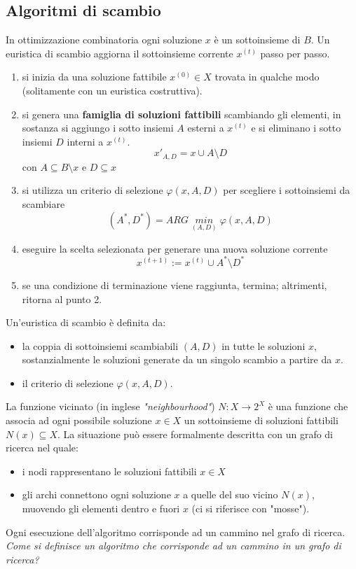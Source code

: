 \documentclass{article}
\begin{document}
\subsection{Algoritmi di scambio}
In ottimizzazione combinatoria ogni soluzione $x$ è un sottoinsieme di $B$. Un euristica
di scambio aggiorna il sottoinsieme corrente $x^{(t)}$ passo per passo.
\begin{enumerate}
    \item si inizia da una soluzione fattibile $x^{(0)}\in X$ trovata in qualche modo
          (solitamente con un euristica costruttiva).
    \item si genera una \textbf{famiglia di soluzioni fattibili} scambiando gli elementi,
          in sostanza si aggiungo i sotto insiemi $A$ esterni a $x^{(t)}$ e si eliminano i sotto insiemi $D$
          interni a $x^{(t)}$.
          $$x'_{A,D}=x\cup A\setminus D$$ con $A\subseteq B\setminus x$ e $D\subseteq x$
    \item si utilizza un criterio di selezione $\varphi(x,A,D)$ per scegliere i sottoinsiemi
          da scambiare
          $$(A^*,D^*)=ARG\;\underset{(A,D)}{min}\;\varphi(x,A,D)$$
    \item eseguire la scelta selezionata per generare una nuova soluzione corrente
          $$x^{(t+1)}:=x^{(t)}\cup A^*\setminus D^*$$
    \item se una condizione di terminazione viene raggiunta, termina; altrimenti, ritorna al punto 2.
\end{enumerate}

Un'euristica di scambio è definita da:
\begin{itemize}
    \item la coppia di sottoinsiemi scambiabili $(A,D)$ in tutte le soluzioni $x$,
          sostanzialmente le soluzioni generate da un singolo scambio a partire da $x$.
    \item il criterio di selezione $\varphi(x,A,D)$.
\end{itemize}
La funzione vicinato (in inglese \textit{"neighbourhood"}) $N:X\rightarrow2^X$ è una
funzione che associa ad ogni possibile soluzione $x\in X$ un sottoinsieme di soluzioni
fattibili $N(x)\subseteq X$. La situazione può essere formalmente descritta con un grafo
di ricerca nel quale:
\begin{itemize}
    \item i nodi rappresentano le soluzioni fattibili $x\in X$
    \item gli archi connettono ogni soluzione $x$ a quelle del suo vicino $N(x)$,
          muovendo gli elementi dentro e fuori $x$ (ci si riferisce con "mosse").
\end{itemize}
Ogni esecuzione dell'algoritmo corrisponde ad un cammino nel grafo di ricerca. \textit{Come
    si definisce un algoritmo che corrisponde ad un cammino in un grafo di ricerca?}
\end{document}
